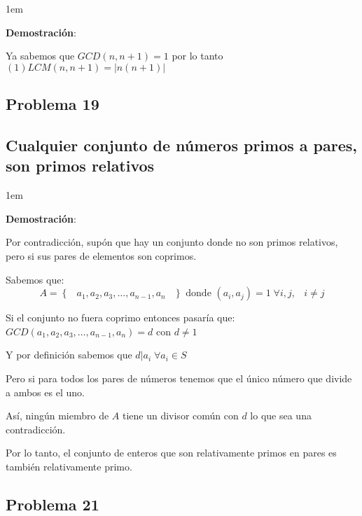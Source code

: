 \documentclass[12pt, fleqn]{article}                             %
\newenvironment{SmallIndentation}[1][0.75em]                    %
    {\begin{adjustwidth}{#1}{}\begin{footnotesize}}                 %
    {\end{footnotesize}\end{adjustwidth}}                           %
\DeclareMathOperator \Space {\quad}                             %
\DeclareMathOperator \MiniSpace {\;}                            %
\newcommand{\Set}[1]{\left\{ \MiniSpace #1 \MiniSpace \right\}} %
\begin{document}
        \begin{SmallIndentation}[1em]
            \textbf{Demostración}:

            Ya sabemos que $GCD(n, n+1) = 1$ por lo tanto 
            $(1)LCM(n, n+1) = |n(n+1)|$
        \end{SmallIndentation}


    \subsection{Problema 19}
    \subsection*{Cualquier conjunto de números primos a pares, son primos relativos}


        \begin{SmallIndentation}[1em]
            \textbf{Demostración}:

            Por contradicción, supón que hay un conjunto donde no son primos 
            relativos, pero si sus pares de elementos son coprimos.

            Sabemos que:
            \begin{equation*}
                A = \Set{a_1, a_2, a_3,\dots, a_{n-1}, a_n}
                \text{ donde } 
                (a_i,a_j) = 1 \; \forall i,j, \MiniSpace i \neq j
            \end{equation*}

            Si el conjunto no fuera coprimo entonces pasaría que:
            $GCD(a_1, a_2, a_3,\dots, a_{n-1}, a_n) = d$ con $d \neq 1$

            Y por definición sabemos que $d|a_i \; \forall a_i \in S$

            Pero si para todos los pares de números tenemos que el único número que 
            divide a ambos es el uno.

            Así, ningún miembro de $A$ tiene un divisor común con $d$ lo que sea
            una contradicción.

            Por lo tanto, el conjunto de enteros que son relativamente primos
            en pares es también relativamente primo.

        \end{SmallIndentation}

    \clearpage
    \subsection{Problema 21}
\end{document}
